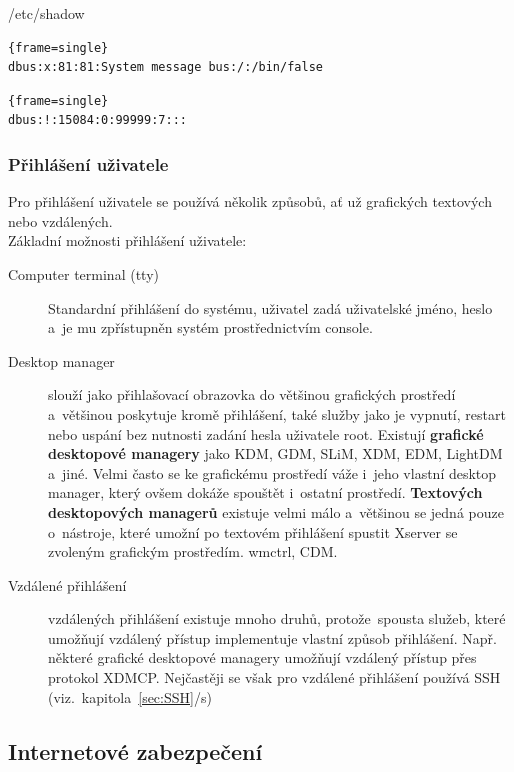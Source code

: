 \documentclass[a4paper,12pt]{article}
\newcommand{\odkazNaKapitolu}[1]{(viz.~kapitola~\ref{#1}/s\pageref{#1})}
\newenvironment{codeframe}{%
  \begin{Sbox} 
    \begin{minipage} 
      {\columnwidth-\leftmargin-\rightmargin-2\fboxsep-2\fboxrule-4pt} 
}{%

  \end{minipage} 
  \end{Sbox} 
  \begin{center} 
    \fcolorbox{black}{codeback}{\TheSbox} 
  \end{center} 
}
\begin{document}
\begin{description}
/etc/shadow
    \begin{codeframe}
      \begin{Verbatim}{frame=single}
dbus:x:81:81:System message bus:/:/bin/false
\end{Verbatim} 
    \end{codeframe}
    \begin{codeframe}
      \begin{Verbatim}{frame=single}
dbus:!:15084:0:99999:7:::
\end{Verbatim} 
    \end{codeframe}

 \end{description}

\subsubsection{Přihlášení uživatele}
Pro přihlášení uživatele se používá několik způsobů, ať už grafických textových nebo vzdálených.\\

Základní možnosti přihlášení uživatele:
\begin{description}
 \item[Computer terminal (tty)] Standardní přihlášení do systému, uživatel zadá uživatelské jméno, heslo a~je mu zpřístupněn systém prostřednictvím console.
 \item[Desktop manager] slouží jako přihlašovací obrazovka do většinou grafických prostředí a~většinou poskytuje kromě přihlášení, také služby jako je vypnutí, restart nebo uspání bez nutnosti zadání hesla uživatele root. Existují \textbf{grafické desktopové managery} jako KDM, GDM, SLiM, XDM, EDM, LightDM a~jiné. Velmi často se ke grafickému prostředí váže i~jeho vlastní desktop manager, který ovšem dokáže spouštět i~ostatní prostředí. \textbf{Textových desktopových managerů} existuje velmi málo a~většinou se jedná pouze o~nástroje, které umožní po textovém přihlášení spustit Xserver se zvoleným grafickým prostředím. wmctrl, CDM.
 \item[Vzdálené přihlášení] vzdálených přihlášení existuje mnoho druhů, protože~spousta služeb, které umožňují vzdálený přístup implementuje vlastní způsob přihlášení. Např. některé grafické desktopové managery umožňují vzdálený přístup přes protokol XDMCP. Nejčastěji se však pro vzdálené přihlášení používá SSH \odkazNaKapitolu{sec:SSH}
\end{description}

\subsection{Internetové zabezpečení}
\end{document}
